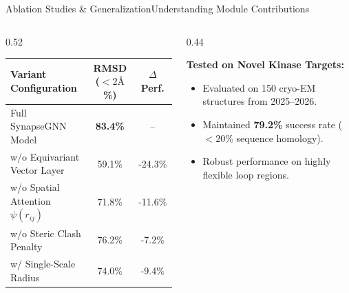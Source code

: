 \documentclass[10pt,aspectratio=169]{beamer}
\begin{document}
\begin{frame}{Ablation Studies \& Generalization}{Understanding Module Contributions}
  \begin{columns}[T]
    \begin{column}{0.52\textwidth}
      \begin{tcolorbox}[defensebox,title={\faTasks \quad Component Sensitivity Analysis}]
        \tiny
        \begin{tabularx}{\textwidth}{X c c}
          \toprule
          \textbf{Variant Configuration} & \textbf{RMSD ($<2\text{\AA}$ \%)} & \textbf{$\Delta$ Perf.} \\
          \midrule
          Full SynapseGNN Model & \textbf{83.4\%} & -- \\
          w/o Equivariant Vector Layer & 59.1\% & -24.3\% \\
          w/o Spatial Attention $\psi(r_{ij})$ & 71.8\% & -11.6\% \\
          w/o Steric Clash Penalty & 76.2\% & -7.2\% \\
          w/ Single-Scale Radius & 74.0\% & -9.4\% \\
          \bottomrule
        \end{tabularx}
      \end{tcolorbox}
    \end{column}
    
    \begin{column}{0.44\textwidth}
      \begin{tcolorbox}[alertbox,title={\faSearchPlus \quad Generalization Out-of-Distribution}]
        \tiny
        \textbf{Tested on Novel Kinase Targets:}
        \begin{itemize}
          \setlength{\itemsep}{2pt}
          \item Evaluated on 150 cryo-EM structures from 2025--2026.
          \item Maintained \textbf{79.2\%} success rate ($<20\%$ sequence homology).
          \item Robust performance on highly flexible loop regions.
        \end{itemize}
      \end{tcolorbox}
    \end{column}
  \end{columns}

  \vspace{4pt}
  \begin{center}
  \end{center}
\end{frame}
\end{document}
